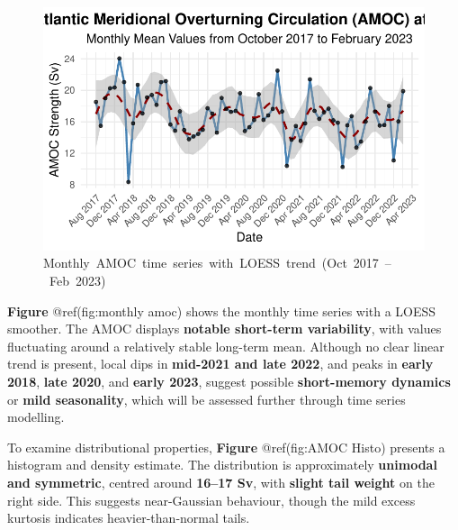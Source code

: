 \documentclass[
  11pt,
]{article}
\begin{document}
\begin{figure}[H]

{\centering \includegraphics{project_files/figure-pdf/fig-monthly amoc-1.pdf}

}

\caption{Monthly~AMOC~time~series~with~LOESS~trend~(Oct~2017~--~Feb~2023)}

\end{figure}%

\textbf{Figure} @ref(fig:monthly amoc) shows the monthly time series
with a LOESS smoother. The AMOC displays \textbf{notable short-term
variability}, with values fluctuating around a relatively stable
long-term mean. Although no clear linear trend is present, local dips in
\textbf{mid-2021 and late 2022}, and peaks in \textbf{early 2018},
\textbf{late 2020}, and \textbf{early 2023}, suggest possible
\textbf{short-memory dynamics} or \textbf{mild seasonality}, which will
be assessed further through time series modelling.

To examine distributional properties, \textbf{Figure} @ref(fig:AMOC
Histo) presents a histogram and density estimate. The distribution is
approximately \textbf{unimodal and symmetric}, centred around
\textbf{16--17 Sv}, with \textbf{slight tail weight} on the right side.
This suggests near-Gaussian behaviour, though the mild excess kurtosis
indicates heavier-than-normal tails.
\end{document}
